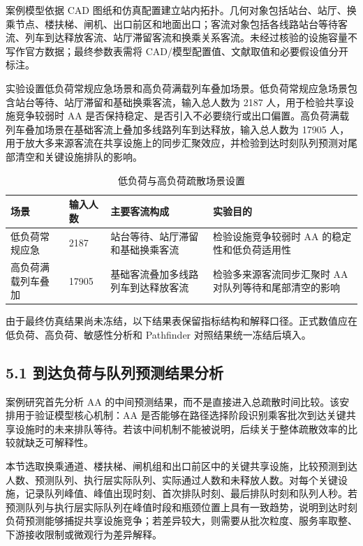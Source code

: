 \documentclass[UTF8,a4paper,12pt]{ctexart}
\begin{document}
案例模型依据 CAD 图纸和仿真配置建立站内拓扑。几何对象包括站台、站厅、换乘节点、楼扶梯、闸机、出口前区和地面出口；客流对象包括各线路站台等待客流、列车到达释放客流、站厅滞留客流和换乘关系客流。未经过核验的设施容量不写作官方数据；最终参数表需将 CAD/模型配置值、文献取值和必要假设值分开标注。

实验设置低负荷常规应急场景和高负荷满载列车叠加场景。低负荷常规应急场景包含站台等待、站厅滞留和基础换乘客流，输入总人数为 2187 人，用于检验共享设施竞争较弱时 AA 是否保持稳定、是否引入不必要绕行或出口偏置。高负荷满载列车叠加场景在基础客流上叠加多线路列车到达释放，输入总人数为 17905 人，用于放大多来源客流在共享设施上的同步汇聚效应，并检验到达时刻队列预测对尾部清空和关键设施排队的影响。

\begin{table}[htbp]
\centering
\caption{低负荷与高负荷疏散场景设置}
\small
\begin{tabular}{p{}p{}p{}p{}}
\toprule
场景 & 输入人数 & 主要客流构成 & 实验目的 \\
\midrule
低负荷常规应急 & 2187 & 站台等待、站厅滞留和基础换乘客流 & 检验设施竞争较弱时 AA 的稳定性和低负荷适用性 \\
高负荷满载列车叠加 & 17905 & 基础客流叠加多线路列车到达释放客流 & 检验多来源客流同步汇聚时 AA 对队列等待和尾部清空的影响 \\
\bottomrule
\end{tabular}
\end{table}

由于最终仿真结果尚未冻结，以下结果表保留指标结构和解释口径。正式数值应在低负荷、高负荷、敏感性分析和 Pathfinder 对照结果统一冻结后填入。

\subsection{5.1 到达负荷与队列预测结果分析}

案例研究首先分析 AA 的中间预测结果，而不是直接进入总疏散时间比较。该安排用于验证模型核心机制：AA 是否能够在路径选择阶段识别乘客批次到达关键共享设施时的未来排队等待。若该中间机制不能被说明，后续关于整体疏散效率的比较就缺乏可解释性。

本节选取换乘通道、楼扶梯、闸机组和出口前区中的关键共享设施，比较预测到达人数、预测队列、执行层实际队列、实际通过人数和未释放人数。对每个关键设施，记录队列峰值、峰值出现时刻、首次排队时刻、最后排队时刻和队列人秒。若预测队列与执行层实际队列在峰值时段和瓶颈位置上具有一致趋势，说明到达时刻负荷预测能够捕捉共享设施竞争；若差异较大，则需要从批次粒度、服务率取整、下游接收限制或微观行为差异解释。
\end{document}
